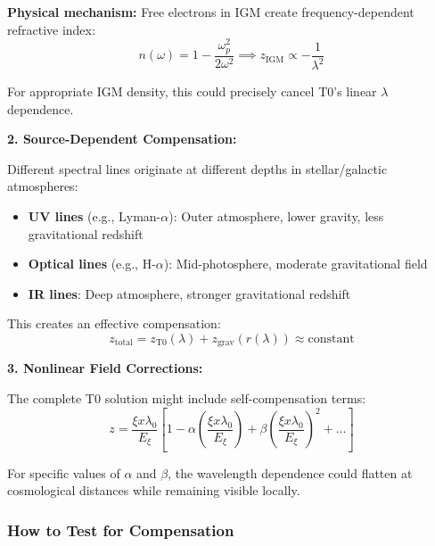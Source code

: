 \documentclass[12pt,a4paper]{article}
\theoremstyle{definition}
\begin{document}
	\textbf{Physical mechanism:} Free electrons in IGM create frequency-dependent refractive index:
	\begin{equation}
		n(\omega) = 1 - \frac{\omega_p^2}{2\omega^2} \implies z_{\text{IGM}} \propto -\frac{1}{\lambda^2}
	\end{equation}
	
	For appropriate IGM density, this could precisely cancel T0's linear $\lambda$ dependence.
	
	\textbf{2. Source-Dependent Compensation:}
	
	Different spectral lines originate at different depths in stellar/galactic atmospheres:
	\begin{itemize}
		\item \textbf{UV lines} (e.g., Lyman-$\alpha$): Outer atmosphere, lower gravity, less gravitational redshift
		\item \textbf{Optical lines} (e.g., H-$\alpha$): Mid-photosphere, moderate gravitational field
		\item \textbf{IR lines}: Deep atmosphere, stronger gravitational redshift
	\end{itemize}
	
	This creates an effective compensation:
	\begin{equation}
		z_{\text{total}} = z_{\text{T0}}(\lambda) + z_{\text{grav}}(r(\lambda)) \approx \text{constant}
	\end{equation}
	
	\textbf{3. Nonlinear Field Corrections:}
	
	The complete T0 solution might include self-compensation terms:
	\begin{equation}
		z = \frac{\xi x \lambda_0}{E_\xi}\left[1 - \alpha\left(\frac{\xi x \lambda_0}{E_\xi}\right) + \beta\left(\frac{\xi x \lambda_0}{E_\xi}\right)^2 + ...\right]
	\end{equation}
	
	For specific values of $\alpha$ and $\beta$, the wavelength dependence could flatten at cosmological distances while remaining visible locally.
	
	\subsubsection{How to Test for Compensation}
	
\end{document}
